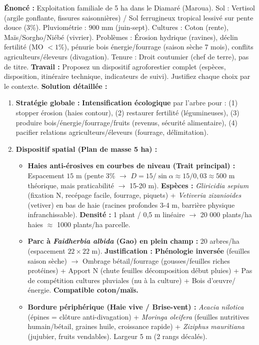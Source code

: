 \documentclass[11pt]{article}
\begin{document}
\begin{exoresolu}
    \textbf{Énoncé :} Exploitation familiale de 5 ha dans le Diamaré (Maroua). Sol : Vertisol (argile gonflante, fissures saisonnières) / Sol ferrugineux tropical lessivé sur pente douce (3\%). Pluviométrie : $900$ mm (juin-sept). Cultures : Coton (rente), Maïs/Sorgho/Niébé (vivrier). Problèmes : Érosion hydrique (ravines), déclin fertilité (MO $< 1\%$), pénurie bois énergie/fourrage (saison sèche 7 mois), conflits agriculteurs/éleveurs (divagation). Tenure : Droit coutumier (chef de terre), pas de titre.
    \textbf{Travail :} Proposez un dispositif agroforestier complet (espèces, disposition, itinéraire technique, indicateurs de suivi). Justifiez chaque choix par le contexte.
    \tcblower
    \textbf{Solution détaillée :}
    \begin{enumerate}
        \item \textbf{Stratégie globale :} \textbf{Intensification écologique} par l'arbre pour : (1) stopper érosion (haies contour), (2) restaurer fertilité (légumineuses), (3) produire bois/énergie/fourrage/fruits (revenus, sécurité alimentaire), (4) pacifier relations agriculteurs/éleveurs (fourrage, délimitation).
        \item \textbf{Dispositif spatial (Plan de masse 5 ha) :}
        \begin{itemize}
            \item \textbf{Haies anti-érosives en courbes de niveau (Trait principal) :} Espacement $15$ m (pente 3\% $\rightarrow$ $D = 15 / \sin \alpha \approx 15 / 0,03 \approx 500$ m théorique, mais praticabilité $\rightarrow$ 15-20 m). \textbf{Espèces :} \emph{Gliricidia sepium} (fixation N, recépage facile, fourrage, piquets) + \emph{Vetiveria zizanioides} (vetiver) en bas de haie (racines profondes 3-4 m, barrière physique infranchissable). \textbf{Densité :} 1 plant / 0,5 m linéaire $\rightarrow$ 20 000 plants/ha haies $\approx$ 1000 plants/ha parcelle.
            \item \textbf{Parc à \emph{Faidherbia albida} (Gao) en plein champ :} 20 arbres/ha (espacement $22 \times 22$ m). \textbf{Justification :} \textbf{Phénologie inversée} (feuilles saison sèche) $\rightarrow$ Ombrage bétail/fourrage (gousses/feuilles riches protéines) + Apport N (chute feuilles décomposition début pluies) + Pas de compétition cultures pluviales (nu à la culture) + Bois d'œuvre/énergie. \textbf{Compatible coton/maïs.}
            \item \textbf{Bordure périphérique (Haie vive / Brise-vent) :} \emph{Acacia nilotica} (épines = clôture anti-divagation) + \emph{Moringa oleifera} (feuilles nutritives humain/bétail, graines huile, croissance rapide) + \emph{Ziziphus mauritiana} (jujubier, fruits vendables). Largeur 5 m (2 rangs décalés).

\end{itemize}
\end{enumerate}
\end{exoresolu}
\end{document}
